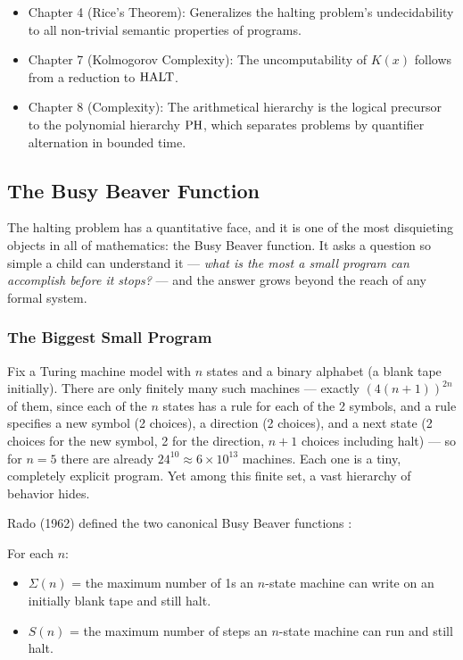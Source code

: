 \begin{itemize}
\item Chapter 4 (Rice's Theorem): Generalizes the halting problem's undecidability to all non-trivial semantic properties of programs.
\item Chapter 7 (Kolmogorov Complexity): The uncomputability of $K(x)$ follows from a reduction to $\text{HALT}$.
\item Chapter 8 (Complexity): The arithmetical hierarchy is the logical precursor to the polynomial hierarchy $\text{PH}$, which separates problems by quantifier alternation in bounded time.
\end{itemize}

\subsection{The Busy Beaver Function}
\label{sec:halting:busybeaver}

The halting problem has a quantitative face, and it is one of the most disquieting objects in all of mathematics: the Busy Beaver function. It asks a question so simple a child can understand it --- \emph{what is the most a small program can accomplish before it stops?} --- and the answer grows beyond the reach of any formal system.

\subsubsection*{The Biggest Small Program}

Fix a Turing machine model with $n$ states and a binary alphabet (a blank tape initially). There are only finitely many such machines --- exactly $(4(n+1))^{2n}$ of them, since each of the $n$ states has a rule for each of the 2 symbols, and a rule specifies a new symbol (2 choices), a direction (2 choices), and a next state (2 choices for the new symbol, 2 for the direction, $n+1$ choices including halt) --- so for $n=5$ there are already $24^{10} \approx 6\times 10^{13}$ machines. Each one is a tiny, completely explicit program. Yet among this finite set, a vast hierarchy of behavior hides.

Rado (1962) defined the two canonical Busy Beaver functions \cite{rado1962}:

\begin{definition}
For each $n$:
\begin{itemize}
\item $\Sigma(n)$ = the maximum number of 1s an $n$-state machine can write on an initially blank tape and still halt.
\item $S(n)$ = the maximum number of steps an $n$-state machine can run and still halt.
\end{itemize}
\end{definition}

